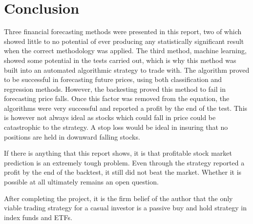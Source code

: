\chapter{Conclusion}

Three financial forecasting methods were presented in this report, two of which showed little to no potential of ever producing any statistically significant result when the correct methodology was applied. The third method, machine learning, showed some potential in the tests carried out, which is why this method was built into an automated algorithmic strategy to trade with. The algorithm proved to be successful in forecasting future prices, using both classification and regression methods. However, the backesting proved this method to fail in forecasting price falls. Once this factor was removed from the equation, the algorithms were very successful and reported a profit by the end of the test. This is however not always ideal as stocks which could fall in price could be catastrophic to the strategy. A stop loss would be ideal in insuring that no positions are held in downward falling stocks.

If there is anything that this report shows, it is that profitable stock market prediction is an extremely tough problem. Even through the strategy reported a profit by the end of the backtest, it still did not beat the market. Whether it is possible at all ultimately remains an open question.

After completing the project, it is the firm belief of the author that the only viable trading strategy for a casual investor is a passive buy and hold strategy in index funds and ETFs.